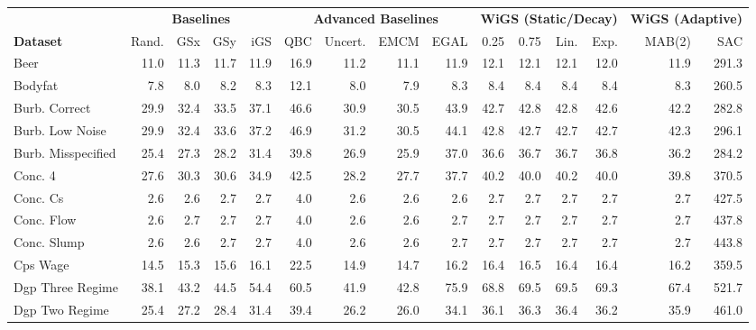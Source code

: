 \begin{table}[htbp]
    \centering
    \scriptsize
    \setlength{\tabcolsep}{2pt}
    \begin{tabular}{l rrrrrrrrrrrrrr}
        \toprule
         & \multicolumn{4}{c}{\textbf{Baselines}} & \multicolumn{4}{c}{\textbf{Advanced Baselines}} & \multicolumn{4}{c}{\textbf{WiGS (Static/Decay)}} & \multicolumn{2}{c}{\textbf{WiGS (Adaptive)}} \\
         \cmidrule(lr){2-5} \cmidrule(lr){6-9} \cmidrule(lr){10-13} \cmidrule(lr){14-15}
        \textbf{Dataset} & Rand. & GSx & GSy & iGS & QBC & Uncert. & EMCM & EGAL & 0.25 & 0.75 & Lin. & Exp. & MAB(2) & SAC \\ \midrule
        Beer & 11.0 & 11.3 & 11.7 & 11.9 & 16.9 & 11.2 & 11.1 & 11.9 & 12.1 & 12.1 & 12.1 & 12.0 & 11.9 & 291.3 \\
        Bodyfat & 7.8 & 8.0 & 8.2 & 8.3 & 12.1 & 8.0 & 7.9 & 8.3 & 8.4 & 8.4 & 8.4 & 8.4 & 8.3 & 260.5 \\
        Burb. Correct & 29.9 & 32.4 & 33.5 & 37.1 & 46.6 & 30.9 & 30.5 & 43.9 & 42.7 & 42.8 & 42.8 & 42.6 & 42.2 & 282.8 \\
        Burb. Low Noise & 29.9 & 32.4 & 33.6 & 37.2 & 46.9 & 31.2 & 30.5 & 44.1 & 42.8 & 42.7 & 42.7 & 42.7 & 42.3 & 296.1 \\
        Burb. Misspecified & 25.4 & 27.3 & 28.2 & 31.4 & 39.8 & 26.9 & 25.9 & 37.0 & 36.6 & 36.7 & 36.7 & 36.8 & 36.2 & 284.2 \\
        Conc. 4 & 27.6 & 30.3 & 30.6 & 34.9 & 42.5 & 28.2 & 27.7 & 37.7 & 40.2 & 40.0 & 40.2 & 40.0 & 39.8 & 370.5 \\
        Conc. Cs & 2.6 & 2.6 & 2.7 & 2.7 & 4.0 & 2.6 & 2.6 & 2.6 & 2.7 & 2.7 & 2.7 & 2.7 & 2.7 & 427.5 \\
        Conc. Flow & 2.6 & 2.7 & 2.7 & 2.7 & 4.0 & 2.6 & 2.6 & 2.7 & 2.7 & 2.7 & 2.7 & 2.7 & 2.7 & 437.8 \\
        Conc. Slump & 2.6 & 2.6 & 2.7 & 2.7 & 4.0 & 2.6 & 2.6 & 2.7 & 2.7 & 2.7 & 2.7 & 2.7 & 2.7 & 443.8 \\
        Cps Wage & 14.5 & 15.3 & 15.6 & 16.1 & 22.5 & 14.9 & 14.7 & 16.2 & 16.4 & 16.5 & 16.4 & 16.4 & 16.2 & 359.5 \\
        Dgp Three Regime & 38.1 & 43.2 & 44.5 & 54.4 & 60.5 & 41.9 & 42.8 & 75.9 & 68.8 & 69.5 & 69.5 & 69.3 & 67.4 & 521.7 \\
        Dgp Two Regime & 25.4 & 27.2 & 28.4 & 31.4 & 39.4 & 26.2 & 26.0 & 34.1 & 36.1 & 36.3 & 36.4 & 36.2 & 35.9 & 461.0 \\

\end{tabular}
\end{table}
